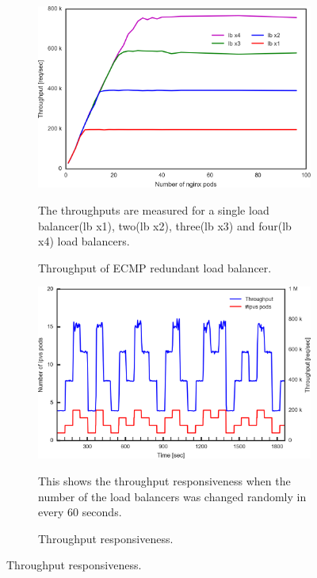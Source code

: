 \begin{figure}[t]

  \begin{subfigure}[t]{\columnwidth}
    \includegraphics[width=0.9\columnwidth,left]{Figs/ecmp_lb_cubic_ieice}
    \caption{Throughput of ECMP redundant load balancer.}
    The throughputs are measured for a single load balancer(lb x1), two(lb x2), three(lb x3) and four(lb x4) load balancers.
    \label{fig:ecmp_lb_cubic_ieice}
  \end{subfigure}

  \par\bigskip

  \begin{subfigure}[t]{\columnwidth}
    \includegraphics[width=0.98\columnwidth,left]{Figs/ecmp_response_ieice}
    \caption{Throughput responsiveness.}
    This shows the throughput responsiveness when the number of the load balancers was changed randomly in every 60 seconds.
    \label{fig:ecmp_response_ieice}
  \end{subfigure}


\end{figure}
